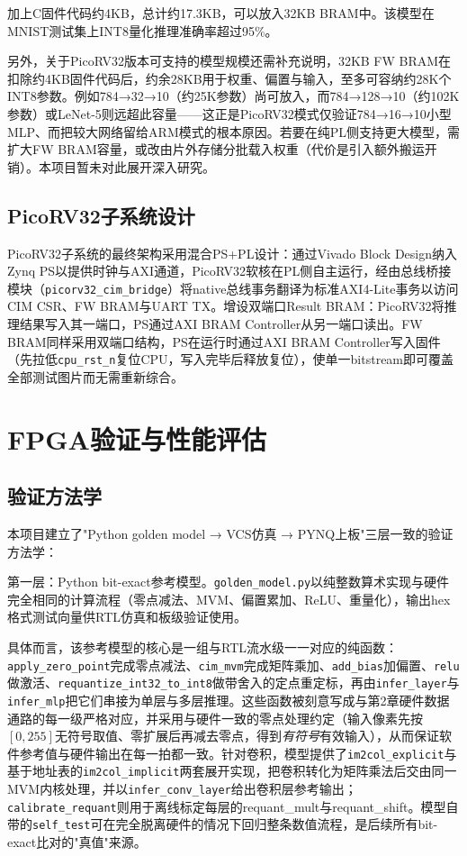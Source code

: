 \documentclass[bachelor,compact,nofont]{xjtuthesis}
\numberwithin{equation}{chapter}
\begin{document}
加上C固件代码约4KB，总计约17.3KB，可以放入32KB BRAM中。该模型在MNIST测试集上INT8量化推理准确率超过95\%。

另外，关于PicoRV32版本可支持的模型规模还需补充说明，32KB FW BRAM在扣除约4KB固件代码后，约余28KB用于权重、偏置与输入，至多可容纳约28K个INT8参数。例如784→32→10（约25K参数）尚可放入，而784→128→10（约102K参数）或LeNet-5则远超此容量——这正是PicoRV32模式仅验证784→16→10小型MLP、而把较大网络留给ARM模式的根本原因。若要在纯PL侧支持更大模型，需扩大FW BRAM容量，或改由片外存储分批载入权重（代价是引入额外搬运开销）。本项目暂未对此展开深入研究。

\section{PicoRV32子系统设计}

PicoRV32子系统的最终架构采用混合PS+PL设计：通过Vivado Block Design纳入Zynq PS以提供时钟与AXI通道，PicoRV32软核在PL侧自主运行，经由总线桥接模块（\texttt{picorv32\_cim\_bridge}）将native总线事务翻译为标准AXI4-Lite事务以访问CIM CSR、FW BRAM与UART TX。增设双端口Result BRAM：PicoRV32将推理结果写入其一端口，PS通过AXI BRAM Controller从另一端口读出。FW BRAM同样采用双端口结构，PS在运行时通过AXI BRAM Controller写入固件（先拉低\texttt{cpu\_rst\_n}复位CPU，写入完毕后释放复位），使单一bitstream即可覆盖全部测试图片而无需重新综合。

\chapter{FPGA验证与性能评估}

\section{验证方法学}

本项目建立了"Python golden model → VCS仿真 → PYNQ上板"三层一致的验证方法学：

第一层：Python bit-exact参考模型。\texttt{golden\_model.py}以纯整数算术实现与硬件完全相同的计算流程（零点减法、MVM、偏置累加、ReLU、重量化），输出hex格式测试向量供RTL仿真和板级验证使用。

具体而言，该参考模型的核心是一组与RTL流水级一一对应的纯函数：
\newline
\texttt{apply\_zero\_point}完成零点减法、\texttt{cim\_mvm}完成矩阵乘加、\texttt{add\_bias}加偏置、\texttt{relu}做激活、\texttt{requantize\_int32\_to\_int8}做带舍入的定点重定标，再由\texttt{infer\_layer}与\texttt{infer\_mlp}把它们串接为单层与多层推理。这些函数被刻意写成与第2章硬件数据通路的每一级严格对应，并采用与硬件一致的零点处理约定（输入像素先按$[0,255]$无符号取值、零扩展后再减去零点，得到\emph{有符号}有效输入），从而保证软件参考值与硬件输出在每一拍都一致。针对卷积，模型提供了\texttt{im2col\_explicit}与基于地址表的\texttt{im2col\_implicit}两套展开实现，把卷积转化为矩阵乘法后交由同一MVM内核处理，并以\texttt{infer\_conv\_layer}给出卷积层参考输出；\texttt{calibrate\_requant}则用于离线标定每层的requant\_mult与requant\_shift。模型自带的\texttt{self\_test}可在完全脱离硬件的情况下回归整条数值流程，是后续所有bit-exact比对的"真值"来源。
\end{document}
